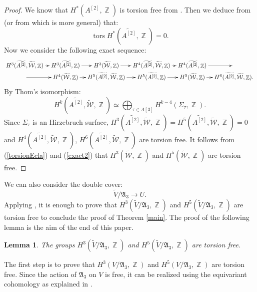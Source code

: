 \documentclass[a4paper]{article}
\newtheorem{lemme}{Lemma}
\theoremstyle{remark}
\DeclareMathOperator{\Z}{\mathbb{Z}}
\DeclareMathOperator{\tors}{tors}
\begin{document}
\begin{proof}
We know that $H^*(A^{[2]},\Z)$ is torsion free from \cite[Theorem 2.2]{Totaro}. 
Then we deduce from \cite[Theorem 7.31]{Voisin} (or from \cite[Theorem 4.1]{Li} which is more general) that:
\begin{equation}
\tors H^*\left(\widetilde{A^{[2]}},\Z\right)=0.
\label{torsionEcla}
\end{equation}
Now we consider the following exact sequence:
\begin{equation}
\xymatrix@C7pt@R0pt{ H^3(\widetilde{A^{[2]}},\widetilde{\mathcal{W}},\Z)\ar[r] & H^{3}(\widetilde{A^{[2]}},\Z)\ar[r] & H^{3}(\widetilde{\mathcal{W}},\Z)\ar[r]&H^{4}(\widetilde{A^{[2]}},\widetilde{\mathcal{W}},\Z)\ar[r] & H^{4}(\widetilde{A^{[2]}},\Z)\ar[r] & \\
\ar[r]&H^{4}(\widetilde{\mathcal{W}},\Z)\ar[r]&H^{5}(\widetilde{A^{[2]}},\widetilde{\mathcal{W}},\Z)\ar[r]& H^{5}(\widetilde{A^{[2]}},\Z)\ar[r] & H^{5}(\widetilde{\mathcal{W}},\Z)\ar[r]&H^{6}(\widetilde{A^{[2]}},\widetilde{\mathcal{W}},\Z)
.}
\label{exact2}
\end{equation}
By Thom's isomorphism:
$$H^k(\widetilde{A^{[2]}},\widetilde{\mathcal{W}},\Z)\simeq \bigoplus_{\tau\in A[3]} H^{k-4}(\Sigma_\tau,\Z).$$
Since $\Sigma_\tau$ is an Hirzebruch surface, $H^3(\widetilde{A^{[2]}},\widetilde{\mathcal{W}},\Z)=H^5(\widetilde{A^{[2]}},\widetilde{\mathcal{W}},\Z)=0$
and $H^{4}(\widetilde{A^{[2]}},\widetilde{\mathcal{W}},\Z)$, $H^{6}(\widetilde{A^{[2]}},\widetilde{\mathcal{W}},\Z)$ are torsion free. 
It follows from (\ref{torsionEcla}) and (\ref{exact2}) that $H^3(\widetilde{\mathcal{W}},\Z)$ and $H^5(\widetilde{\mathcal{W}},\Z)$ are torsion free.
\end{proof}
We can also consider the double cover:
$$\widetilde{V}/\mathfrak{A}_3\rightarrow U.$$
Applying \cite[Theorem 5.4 ]{Transfers}, it is enough to prove that $H^3(\widetilde{V}/\mathfrak{A}_3,\Z)$ and $H^5(\widetilde{V}/\mathfrak{A}_3,\Z)$
are torsion free to conclude the proof of Theorem \ref{main}. The proof of the following lemma is the aim of the end of this paper.
\begin{lemme}\label{last}
The groups $H^3(\widetilde{V}/\mathfrak{A}_3,\Z)$ and $H^5(\widetilde{V}/\mathfrak{A}_3,\Z)$ are torsion free.
\end{lemme}
The first step is to prove that $H^3(V/\mathfrak{A}_3,\Z)$ and $H^5(V/\mathfrak{A}_3,\Z)$ are torsion free.
Since the action of $\mathfrak{A}_3$ on $V$ is free, it can be realized using the equivariant cohomology as explained in \cite[Section 4]{Lol}.
\end{document}
